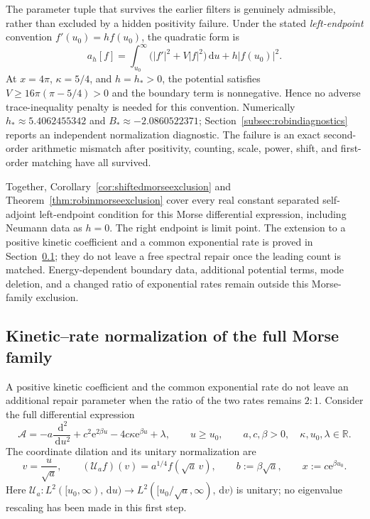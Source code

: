 \documentclass[11pt,letterpaper]{article}
\numberwithin{equation}{section}
\theoremstyle{definition}
\theoremstyle{remark}
\newcommand{\R}{\mathbb R}
\newcommand{\dd}{\,\mathrm d}
\newcommand{\e}{\mathrm e}
\begin{document}
The parameter tuple that survives the earlier filters is genuinely admissible, rather than excluded by a hidden positivity failure. Under the stated \emph{left-endpoint} convention $f'(u_0)=hf(u_0)$, the quadratic form is
\begin{equation}
 a_h[f]=\int_{u_0}^{\infty}\bigl(|f'|^2+V|f|^2\bigr)\dd u
                   +h|f(u_0)|^2.
 \label{eq:robinboundaryform}
\end{equation}
At $x=4\pi$, $\kappa=5/4$, and $h=h_*>0$, the potential satisfies
$V\geq16\pi(\pi-5/4)>0$ and the boundary term is nonnegative. Hence no adverse trace-inequality penalty is needed for this convention. Numerically $h_*\approx5.4062455342$ and $B_*\approx-2.0860522371$; Section~\ref{subsec:robindiagnostics} reports an independent normalization diagnostic. The failure is an exact second-order arithmetic mismatch after positivity, counting, scale, power, shift, and first-order matching have all survived.

Together, Corollary~\ref{cor:shiftedmorseexclusion} and Theorem~\ref{thm:robinmorseexclusion} cover every real constant separated self-adjoint left-endpoint condition for this Morse differential expression, including Neumann data as $h=0$. The right endpoint is limit point. The extension to a positive kinetic coefficient and a common exponential rate is proved in Section~\ref{subsec:kineticrate}; they do not leave a free spectral repair once the leading count is matched. Energy-dependent boundary data, additional potential terms, mode deletion, and a changed ratio of exponential rates remain outside this Morse-family exclusion.

\subsection{Kinetic--rate normalization of the full Morse family}
\label{subsec:kineticrate}
A positive kinetic coefficient and the common exponential rate do not leave an additional repair parameter when the ratio of the two rates remains $2:1$. Consider the full differential expression
\begin{equation}
 \mathcal A=-a\frac{\dd^2}{\dd u^2}
          +c^2\e^{2\beta u}-4c\kappa\e^{\beta u}+\lambda,
 \qquad u\geq u_0,\qquad a,c,\beta>0,
 \quad \kappa,u_0,\lambda\in\R.
 \label{eq:generalkineticmorse}
\end{equation}
The coordinate dilation and its unitary normalization are
\begin{equation}
 v=\frac{u}{\sqrt a},\qquad
 (\mathcal U_a f)(v)=a^{1/4}f(\sqrt a\,v),\qquad
 b:=\beta\sqrt a,\qquad x:=c\e^{\beta u_0}.
 \label{eq:kineticunitary}
\end{equation}
Here $\mathcal U_a:L^2([u_0,\infty),\dd u)\to
L^2([u_0/\sqrt a,\infty),\dd v)$ is unitary; no eigenvalue rescaling has been made in this first step.
\end{document}
